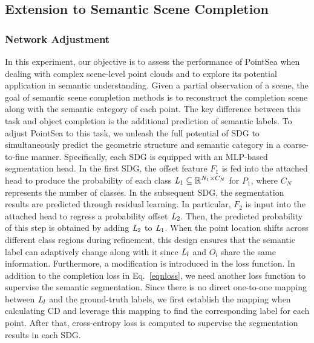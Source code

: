 \subsection{Extension to Semantic Scene Completion}

\subsubsection{Network Adjustment}
In this experiment, our objective is to assess the performance of PointSea when dealing with complex scene-level point clouds and to explore its potential application in semantic understanding.
Given a partial observation of a scene, the goal of semantic scene completion methods is to reconstruct the completion scene along with the semantic category of each point.
The key difference between this task and object completion is the additional prediction of semantic labels.
To adjust PointSea to this task, we unleash the full potential of SDG to simultaneously predict the geometric structure and semantic category in a coarse-to-fine manner.
Specifically, each SDG is equipped with an MLP-based segmentation head. In the first SDG, the offset feature $F_{1}$ is fed into the attached head to produce the probability of each class $\emph{L}_{1}\subseteq\mathbb{R}^{N_{1} \times C_N}$ for $P_1$, where $C_N$ represents the number of classes. In the subsequent SDG, the segmentation results are predicted through residual learning. In particular, $F_{2}$ is input into the attached head to regress a probability offset $\emph{L}_{2}$. Then, the predicted probability of this step is obtained by adding $\emph{L}_{2}$ to $\emph{L}_{1}$.
When the point location shifts across different class regions during refinement, this design ensures that the semantic label can adaptively change along with it since $\emph{L}_{l}$ and $O_l$ share the same information.
Furthermore, a modification is introduced in the loss function. In addition to the completion loss in Eq.~\ref{eqnloss}, we need another loss function to supervise the semantic segmentation. Since there is no direct one-to-one mapping between $\emph{L}_{l}$ and the ground-truth labels, we first establish the mapping when calculating CD and leverage this mapping to find the corresponding label for each point. After that, cross-entropy loss is computed to supervise the segmentation results in each SDG. 

